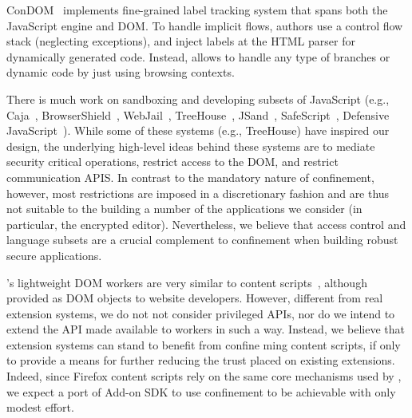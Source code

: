 %

ConDOM~\cite{ConDOM} implements fine-grained label tracking system
that spans both the JavaScript engine and DOM.
%
To handle implicit flows, authors use a
control flow stack (neglecting exceptions), and inject labels at the HTML parser
for dynamically generated code. Instead, \sys{} allows to handle any type of
branches or dynamic code by just using browsing contexts.


There is much work on sandboxing and developing subsets of JavaScript (e.g.,
Caja~\cite{GoogleCaja}, BrowserShield~\cite{Reis:2007},
WebJail~\cite{VanAcker:2011}, TreeHouse~\cite{Ingram:2012},
JSand~\cite{Agten:2012:JCC}, SafeScript~\cite{SafeScript}, Defensive
JavaScript~\cite{djs}). 
%
While some of these systems (e.g., TreeHouse) have inspired our design, the
underlying high-level ideas behind these systems are to mediate security
critical operations, restrict access to the DOM, and restrict communication APIS.
%
In contrast to the mandatory nature of confinement, however, most restrictions
are imposed in a discretionary fashion and are thus not suitable to the
building a number of the applications we consider (in particular, the encrypted
editor).
%
Nevertheless, we believe that access control and language subsets are a crucial
complement to confinement when building robust secure applications.



%
\sys{}'s lightweight DOM workers are very similar to content
scripts~\cite{Carlini:2012}, although provided as DOM objects to
website developers.
%
However, different from real extension systems, we do not not consider
privileged APIs, nor do we intend to extend the API made available to
workers in such a way.
%
Instead, we believe that extension systems can stand to benefit from
confine ming content scripts, if only to provide a means for further
reducing the trust placed on existing extensions.
%
Indeed, since Firefox content scripts rely on the same core mechanisms
used by \sys{}, we expect a port of Add-on SDK to use confinement to
be achievable with only modest effort.
 


